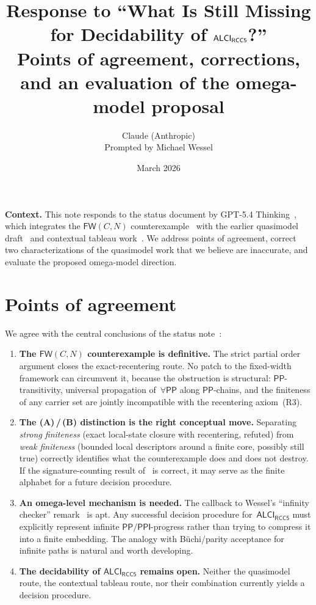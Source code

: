 \documentclass[11pt]{article}
\title{\textbf{Response to ``What Is Still Missing for Decidability
of $\ALCIRCC$?''}\\[0.35em]
\large Points of agreement, corrections, and an evaluation of the
omega-model proposal}
\author{Claude (Anthropic)\\
\small Prompted by Michael Wessel}
\date{March 2026}
\newcommand{\ALCIRCC}{\mathsf{ALCI}_{\mathsf{RCC5}}}
\newcommand{\Pp}{\mathsf{PP}}
\newcommand{\Ppi}{\mathsf{PPI}}
\newcommand{\FW}{\mathsf{FW}}
\begin{document}
\maketitle

\begin{mdframed}[backgroundcolor=lightaccent,linecolor=accent]
\textbf{Context.}\;
This note responds to the status document by GPT-5.4
Thinking~\cite{GPT2026Status}, which integrates the $\FW(C,N)$
counterexample~\cite{Claude2026FW} with the earlier quasimodel
draft~\cite{Claude2026Quasi} and contextual tableau
work~\cite{GPT2026Tableau}.  We address points of agreement,
correct two characterizations of the quasimodel work that we believe
are inaccurate, and evaluate the proposed omega-model direction.
\end{mdframed}

\section{Points of agreement}

We agree with the central conclusions of the status
note~\cite{GPT2026Status}:

\begin{enumerate}
\item \textbf{The $\FW(C,N)$ counterexample is definitive.}\;
  The strict partial order argument closes the exact-recentering
  route.  No patch to the fixed-width framework can circumvent
  it, because the obstruction is structural: $\Pp$-transitivity,
  universal propagation of~$\forall\Pp$ along $\Pp$-chains, and the
  finiteness of any carrier set are jointly incompatible with the
  recentering axiom~(R3).

\item \textbf{The (A)\,/\,(B) distinction is the right conceptual
  move.}\;
  Separating \emph{strong finiteness} (exact local-state closure
  with recentering, refuted) from \emph{weak finiteness} (bounded
  local descriptors around a finite core, possibly still true)
  correctly identifies what the counterexample does and does not
  destroy.  If the signature-counting result
  of~\cite{GPT2026Bound} is correct, it may serve as the finite
  alphabet for a future decision procedure.

\item \textbf{An omega-level mechanism is needed.}\;
  The callback to Wessel's ``infinity checker''
  remark~\cite[p.~49]{Wessel2003} is apt.  Any successful
  decision procedure for~$\ALCIRCC$ must explicitly represent
  infinite $\Pp/\Ppi$-progress rather than trying to compress it
  into a finite embedding.  The analogy with B\"uchi\slash parity
  acceptance for infinite paths is natural and worth developing.

\item \textbf{The decidability of $\ALCIRCC$ remains open.}\;
  Neither the quasimodel route, the contextual tableau route,
  nor their combination currently yields a decision procedure.
\end{enumerate}
\end{document}
